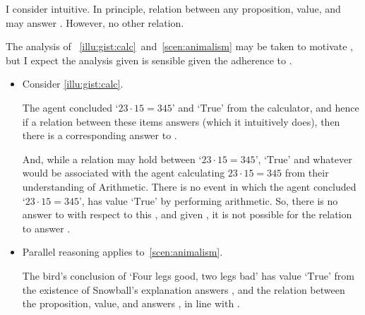 \begin{note}
  I consider \issueInclusion{} intuitive.
  In principle, relation between any proposition, value, and \pool{} may answer \qWhy{}.
  However, no other relation.

  The analysis of ~\ref{illu:gist:calc}~and~\ref{scen:animalism} may be taken to motivate \issueInclusion{}, but I expect the analysis given is sensible given the adherence to \issueInclusion{}.

  \begin{itemize}[noitemsep]
  \item
    Consider \autoref{illu:gist:calc}.

    The agent concluded `\(23 \cdot 15 = 345\)' and `\(\text{True}\)' from the calculator, and hence if a relation between these items answers \qWhy{} (which it intuitively does), then there is a corresponding answer to \qHow{}.

    And, while a relation may hold between `\(23 \cdot 15 = 345\)', `\(\text{True}\)' and whatever \pool{} would be associated with the agent calculating \(23 \cdot 15 = 345\) from their understanding of Arithmetic.
    There is no event in which the agent concluded `\(23 \cdot 15 = 345\)', has value `\(\text{True}\)' by performing arithmetic.
    So, there is no answer to \qHow{} with respect to this \pool{}, and given \issueInclusion{}, it is not possible for the relation to answer \qWhy{}.
  \item
    Parallel reasoning applies to~\autoref{scen:animalism}.

    The bird's conclusion of `Four legs good, two legs bad' has value `\(\text{True}\)' from the existence of Snowball's explanation answers \qHow{}, and the relation between the proposition, value, and \pool{} answers \qWhy{}, in line with \issueInclusion{}.


\end{itemize}
\end{note}
